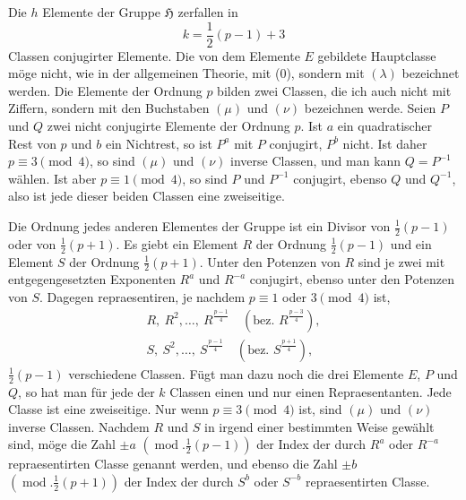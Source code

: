 \documentclass[11pt]{article}
\newcommand{\grp}{\mathfrak{H}}
\begin{document}
Die $h$ Elemente der Gruppe $\grp$ zerfallen in
\begin{equation*}\tag{4.}
k=\frac{1}{2}(p-1)+3
\end{equation*}
Classen conjugirter Elemente. Die von dem Elemente $E$ gebildete Hauptclasse möge nicht, wie in der allgemeinen Theorie, mit (0), sondern mit $(\lambda)$ bezeichnet werden. Die Elemente der Ordnung $p$ bilden zwei Classen, die ich auch nicht mit Ziffern, sondern mit den Buchstaben $(\mu)$ und $(\nu)$ bezeichnen werde. Seien $P$ und $Q$ zwei nicht conjugirte Elemente der Ordnung $p$. Ist $a$ ein quadratischer Rest von $p$ und $b$ ein Nichtrest, so ist $P^a$ mit $P$ conjugirt, $P^b$ nicht. Ist daher $p\equiv3\pmod{4}$, so sind $(\mu)$ und $(\nu)$ inverse Classen, und man kann $Q=P^{-1}$ wählen. Ist aber $p\equiv1\pmod{4}$, so sind $P$ und $P^{-1}$ conjugirt, ebenso $Q$ und $Q^{-1}$, also ist jede dieser beiden Classen eine zweiseitige.

Die Ordnung jedes anderen Elementes der Gruppe ist ein Divisor von $\frac12(p-1)$ oder von $\frac12(p+1)$. Es giebt ein Element $R$ der Ordnung $\frac12(p-1)$ und ein Element $S$ der Ordnung $\frac12(p+1)$. Unter den Potenzen von $R$ sind je zwei mit entgegengesetzten Exponenten $R^a$ und $R^{-a}$ conjugirt, ebenso unter den Potenzen von $S$. Dagegen repraesentiren, je nachdem $p\equiv1$ oder $3\pmod{4}$ ist,
\begin{equation*}\tag{5.}
\begin{array}{c}
R,\ R^2,\ldots,\ R^{\frac{p-1}{4}}\quad\left(\text{bez. }R^{\frac{p-3}{4}}\right),\\[0.35em]
S,\ S^2,\ldots,\ S^{\frac{p-1}{4}}\quad\left(\text{bez. }S^{\frac{p+1}{4}}\right),
\end{array}
\end{equation*}
$\frac12(p-1)$ verschiedene Classen. Fügt man dazu noch die drei Elemente $E$, $P$ und $Q$, so hat man für jede der $k$ Classen einen und nur einen Repraesentanten. Jede Classe ist eine zweiseitige. Nur wenn $p\equiv3\pmod{4}$ ist, sind $(\mu)$ und $(\nu)$ inverse Classen. Nachdem $R$ und $S$ in irgend einer bestimmten Weise gewählt sind, möge die Zahl $\pm a$ $\left(\operatorname{mod}.\frac12(p-1)\right)$ der Index der durch $R^a$ oder $R^{-a}$ repraesentirten Classe genannt werden, und ebenso die Zahl $\pm b$ $\left(\operatorname{mod}.\frac12(p+1)\right)$ der Index der durch $S^b$ oder $S^{-b}$ repraesentirten Classe.
\end{document}
